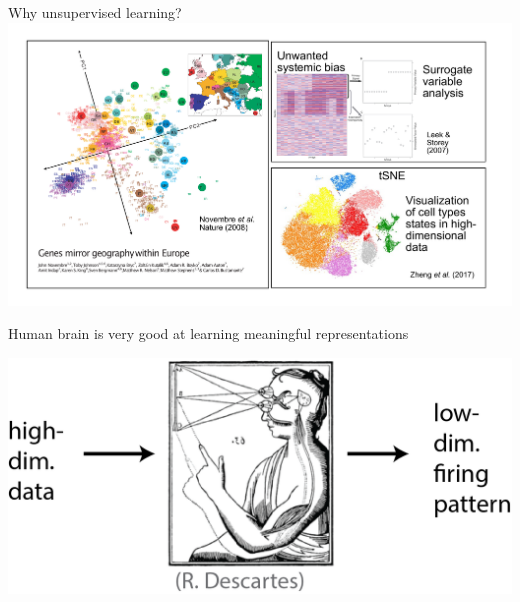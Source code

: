 \documentclass[
  ignorenonframetext,
  aspectratio=169]{beamer}
\begin{document}
\begin{frame}{Why unsupervised learning?}
\protect\hypertarget{why-unsupervised-learning}{}
\includegraphics{Vis/unsupervised/why_unsupervised_learning.pdf}
\end{frame}

\begin{frame}{Human brain is very good at learning meaningful
representations}
\protect\hypertarget{human-brain-is-very-good-at-learning-meaningful-representations}{}
\scriptsize

\begin{center}\includegraphics[width=.7\linewidth]{./Vis/unsupervised/descartes} \end{center}

\normalsize
\end{frame}
\end{document}

